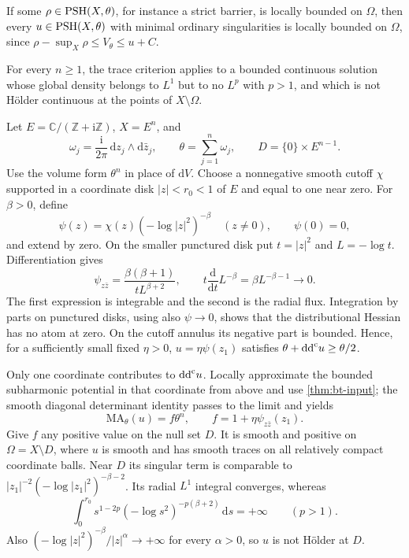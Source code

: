 If some $\rho\in\mathrm{PSH}(X,\theta)$, for instance a strict barrier, is locally bounded on $\Omega$, then every $u\in\mathrm{PSH}(X,\theta)$ with minimal ordinary singularities is locally bounded on $\Omega$, since $\rho-\sup_X\rho\leq V_\theta\leq u+C$.

\begin{example}\label{ex:logarithmic-continuous-density}
For every $n\geq1$, the trace criterion applies to a bounded continuous solution whose global density belongs to $L^1$ but to no $L^p$ with $p>1$, and which is not H\"older continuous at the points of $X\setminus\Omega$.

Let $E=\mathbb C/(\mathbb Z+\mathrm{i}\mathbb Z)$, $X=E^n$, and
\[
 \omega_j=\frac{\mathrm{i}}{2\pi}\,\mathrm{d}z_j\wedge\mathrm{d}\bar z_j,
 \qquad \theta=\sum_{j=1}^n\omega_j,
 \qquad D=\{0\}\times E^{n-1}.
\]
Use the volume form $\theta^n$ in place of $\mathrm{d}V$. Choose a nonnegative smooth cutoff $\chi$ supported in a coordinate disk $|z|<r_0<1$ of $E$ and equal to one near zero. For $\beta>0$, define
\[
 \psi(z)=\chi(z)(-\log|z|^2)^{-\beta}\quad(z\ne0),
 \qquad \psi(0)=0,
\]
and extend by zero. On the smaller punctured disk put $t=|z|^2$ and $L=-\log t$. Differentiation gives
\begin{equation}\label{eq:continuous-logarithmic-profile}
 \psi_{z\bar z}=\frac{\beta(\beta+1)}{tL^{\beta+2}},
 \qquad t\frac{\mathrm{d}}{\mathrm{d}t}L^{-\beta}
       =\beta L^{-\beta-1}\longrightarrow0.
\end{equation}
The first expression is integrable and the second is the radial flux. Integration by parts on punctured disks, using also $\psi\to0$, shows that the distributional Hessian has no atom at zero. On the cutoff annulus its negative part is bounded. Hence, for a sufficiently small fixed $\eta>0$, $u=\eta\psi(z_1)$ satisfies $\theta+\mathrm{dd}^{\mathrm{c}} u\geq\theta/2$.

Only one coordinate contributes to $\mathrm{dd}^{\mathrm{c}} u$. Locally approximate the bounded subharmonic potential in that coordinate from above and use \cref{thm:bt-input}; the smooth diagonal determinant identity passes to the limit and yields
\[
 \mathrm{MA}_\theta(u)=f\theta^n,
 \qquad f=1+\eta\psi_{z\bar z}(z_1).
\]
Give $f$ any positive value on the null set $D$. It is smooth and positive on $\Omega=X\setminus D$, where $u$ is smooth and has smooth traces on all relatively compact coordinate balls. Near $D$ its singular term is comparable to $|z_1|^{-2}(-\log|z_1|^2)^{-\beta-2}$. Its radial $L^1$ integral converges, whereas
\[
 \int_0^{r_0}s^{1-2p}(-\log s^2)^{-p(\beta+2)}\,\mathrm{d}s=+\infty
 \qquad(p>1).
\]
Also $(-\log|z|^2)^{-\beta}/|z|^\alpha\to+\infty$ for every $\alpha>0$, so $u$ is not H\"older at $D$.
\end{example}

